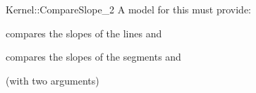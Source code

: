\begin{ccRefFunctionObjectConcept}{Kernel::CompareSlope_2}
A model for this must provide:


      {compares the slopes of the lines  and }

      {compares the slopes of the segments  and }

\ccRefines
{} (with two arguments)

\ccSeeAlso

 \\

\end{ccRefFunctionObjectConcept}

